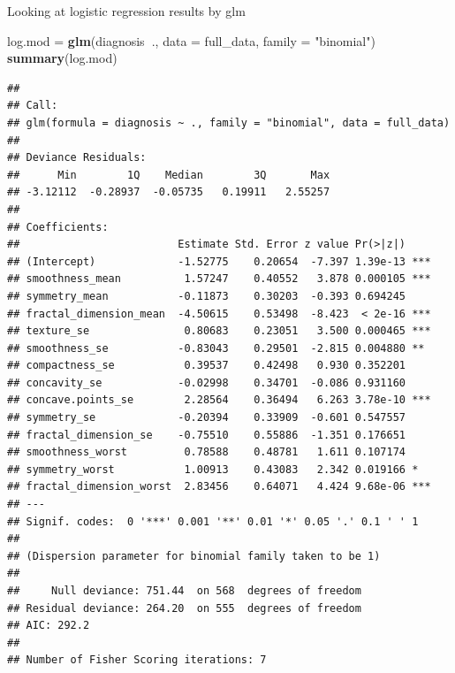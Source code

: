 \documentclass[]{article}
\newenvironment{Shaded}{\begin{snugshade}}{\end{snugshade}}
\newcommand{\KeywordTok}[1]{\textcolor[rgb]{0.13,0.29,0.53}{\textbf{#1}}}
\newcommand{\DataTypeTok}[1]{\textcolor[rgb]{0.13,0.29,0.53}{#1}}
\newcommand{\DecValTok}[1]{\textcolor[rgb]{0.00,0.00,0.81}{#1}}
\newcommand{\StringTok}[1]{\textcolor[rgb]{0.31,0.60,0.02}{#1}}
\newcommand{\OperatorTok}[1]{\textcolor[rgb]{0.81,0.36,0.00}{\textbf{#1}}}
\newcommand{\NormalTok}[1]{#1}
\begin{document}
Looking at logistic regression results by glm

\begin{Shaded}
\begin{Highlighting}[]
\NormalTok{log.mod =}\StringTok{ }\KeywordTok{glm}\NormalTok{(diagnosis}\OperatorTok{~}\NormalTok{., }\DataTypeTok{data =}\NormalTok{ full_data, }\DataTypeTok{family =} \StringTok{"binomial"}\NormalTok{)}
\KeywordTok{summary}\NormalTok{(log.mod)}
\end{Highlighting}
\end{Shaded}

\begin{verbatim}
## 
## Call:
## glm(formula = diagnosis ~ ., family = "binomial", data = full_data)
## 
## Deviance Residuals: 
##      Min        1Q    Median        3Q       Max  
## -3.12112  -0.28937  -0.05735   0.19911   2.55257  
## 
## Coefficients:
##                         Estimate Std. Error z value Pr(>|z|)    
## (Intercept)             -1.52775    0.20654  -7.397 1.39e-13 ***
## smoothness_mean          1.57247    0.40552   3.878 0.000105 ***
## symmetry_mean           -0.11873    0.30203  -0.393 0.694245    
## fractal_dimension_mean  -4.50615    0.53498  -8.423  < 2e-16 ***
## texture_se               0.80683    0.23051   3.500 0.000465 ***
## smoothness_se           -0.83043    0.29501  -2.815 0.004880 ** 
## compactness_se           0.39537    0.42498   0.930 0.352201    
## concavity_se            -0.02998    0.34701  -0.086 0.931160    
## concave.points_se        2.28564    0.36494   6.263 3.78e-10 ***
## symmetry_se             -0.20394    0.33909  -0.601 0.547557    
## fractal_dimension_se    -0.75510    0.55886  -1.351 0.176651    
## smoothness_worst         0.78588    0.48781   1.611 0.107174    
## symmetry_worst           1.00913    0.43083   2.342 0.019166 *  
## fractal_dimension_worst  2.83456    0.64071   4.424 9.68e-06 ***
## ---
## Signif. codes:  0 '***' 0.001 '**' 0.01 '*' 0.05 '.' 0.1 ' ' 1
## 
## (Dispersion parameter for binomial family taken to be 1)
## 
##     Null deviance: 751.44  on 568  degrees of freedom
## Residual deviance: 264.20  on 555  degrees of freedom
## AIC: 292.2
## 
## Number of Fisher Scoring iterations: 7
\end{verbatim}

\begin{Shaded}
\end{Shaded}
\end{document}
